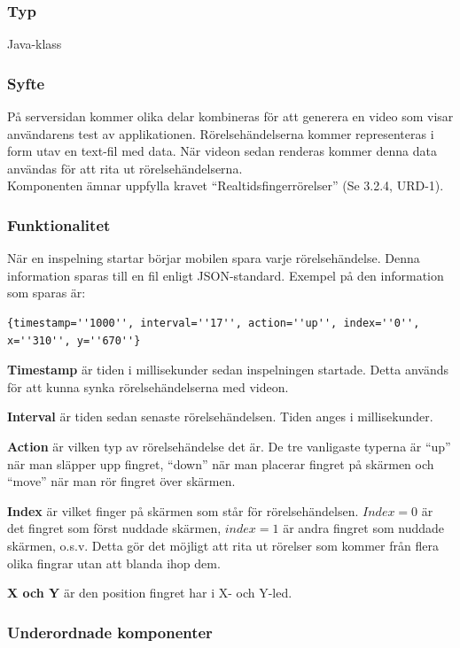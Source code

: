 \subsubsection{Typ}
Java-klass

\subsubsection{Syfte}
På serversidan kommer olika delar kombineras för att generera en video som visar användarens test av applikationen. Rörelsehändelserna kommer representeras i form utav en text-fil med data. När videon sedan renderas kommer denna data användas för att rita ut rörelsehändelserna. \\
Komponenten ämnar uppfylla kravet ``Realtidsfingerrörelser'' (Se 3.2.4, URD-1).

\subsubsection{Funktionalitet}
När en inspelning startar börjar mobilen spara varje rörelsehändelse. Denna information sparas till en fil enligt JSON-standard. Exempel på den information som sparas är: \\
\begin{verbatim}
{timestamp=''1000'', interval=''17'', action=''up'', index=''0'', x=''310'', y=''670''}
\end{verbatim} 
\textbf{Timestamp} är tiden i millisekunder sedan inspelningen startade. Detta används för att kunna synka rörelsehändelserna med videon.

\textbf{Interval} är tiden sedan senaste rörelsehändelsen. Tiden anges i millisekunder.
 
 \textbf{Action} är vilken typ av rörelsehändelse det är. De tre vanligaste typerna är ``up'' när man släpper upp fingret, ``down'' när man placerar fingret på skärmen och ``move'' när man rör fingret över skärmen.
 
 \textbf{Index} är vilket finger på skärmen som står för rörelsehändelsen. $Index=0$ är det fingret som först nuddade skärmen, $index=1$ är andra fingret som nuddade skärmen, o.s.v. Detta gör det möjligt att rita ut rörelser som kommer från flera olika fingrar utan att blanda ihop dem.
 
 \textbf{X och Y} är den position fingret har i X- och Y-led.
 
\subsubsection{Underordnade komponenter}

